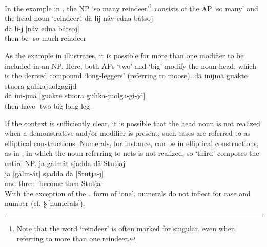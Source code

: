 In the example in , the NP  ‘so many reindeer’\footnote{Note that the word  ‘reindeer’ is often marked for singular, even when referring to more than one reindeer.} 
consists of the AP  ‘so many’ and the head noun  ‘reindeer’. 
\ea\label{NPstructureEx3}%
\glll	dä lij nåv edna båtsoj\\
	dä li-j [nåv edna {båtsoj]\subNP}\\
	then be- so much reindeer\BS{}\\\nopagebreak
{}	
\z

As the example in  illustrates, it is possible for more than one modifier to be included in an NP. Here, both APs  ‘two’ and  ‘big’ modify the noun head, which is the derived compound  ‘long-leggers’ (referring to moose). 
\ea\label{NPstructureEx4}%
\glll	dä inijmä guäkte stuora guhkajuolgagijd\\
	dä ini-jmä [guäkte stuora {guhka-juolga-gi-jd]\subNP}\\
	then have- two big long-leg--\\\nopagebreak
{}	
\z

If the context is sufficiently clear, it is possible that the head noun is not realized when a demonstrative and/or modifier is present; such cases are referred to as elliptical constructions. 
Numerals, for instance, can be in elliptical constructions, %
as in , in which the noun referring to nets is not realized, so  ‘third’ composes the entire NP. %
\ea\label{NPstructureEx6}
\glll	ja gålmát sjadda dä Stutjaj\\
	ja {[gålm-át]\subNP{}} sjadda dä {[Stutja-j]\subNP{}}\\
	and three- become\BS{} then Stutja-\\\nopagebreak
{}	
\z
With the exception of the \ACCs.\SGs\ form of  ‘one’, numerals do not inflect for case and number (cf. §\,\ref{numerals}). 

